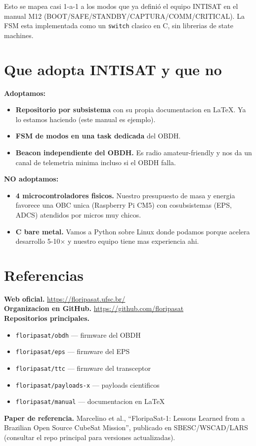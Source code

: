 \documentclass[11pt,a4paper,oneside,openright]{book}
\begin{document}
Esto se mapea casi 1-a-1 a los modos que ya defini\'o el equipo INTISAT
en el manual M12 (BOOT/SAFE/STANDBY/CAPTURA/COMM/CRITICAL). La FSM esta
implementada como un \texttt{switch} clasico en C, sin librerias de
state machines.

\section{Que adopta INTISAT y que no}

\begin{logrado}
\textbf{Adoptamos:}
\begin{itemize}[leftmargin=2em]
  \item \textbf{Repositorio por subsistema} con su propia documentacion
    en LaTeX. Ya lo estamos haciendo (este manual es ejemplo).
  \item \textbf{FSM de modos en una task dedicada} del OBDH.
  \item \textbf{Beacon independiente del OBDH.} Es radio
    amateur-friendly y nos da un canal de telemetria minima incluso
    si el OBDH falla.
\end{itemize}

\textbf{NO adoptamos:}
\begin{itemize}[leftmargin=2em]
  \item \textbf{4 microcontroladores fisicos.} Nuestro presupuesto
    de masa y energia favorece una OBC unica (Raspberry Pi CM5)
    con cosubsistemas (EPS, ADCS) atendidos por micros muy chicos.
  \item \textbf{C bare metal.} Vamos a Python sobre Linux donde
    podamos porque acelera desarrollo 5-10$\times$ y nuestro
    equipo tiene mas experiencia ahi.
\end{itemize}
\end{logrado}

\section{Referencias}

\begin{payloadbox}
\textbf{Web oficial.} \url{https://floripasat.ufsc.br/}\\[0.3em]
\textbf{Organizacion en GitHub.} \url{https://github.com/floripasat}\\[0.3em]
\textbf{Repositorios principales.}
\begin{itemize}[leftmargin=2em]
  \item \texttt{floripasat/obdh} --- firmware del OBDH
  \item \texttt{floripasat/eps} --- firmware del EPS
  \item \texttt{floripasat/ttc} --- firmware del transceptor
  \item \texttt{floripasat/payloads-x} --- payloads cientificos
  \item \texttt{floripasat/manual} --- documentacion en LaTeX
\end{itemize}
\textbf{Paper de referencia.} Marcelino et al., ``FloripaSat-1:
Lessons Learned from a Brazilian Open Source CubeSat Mission'',
publicado en SBESC/WSCAD/LARS (consultar el repo principal para
versiones actualizadas).
\end{payloadbox}
\end{document}
